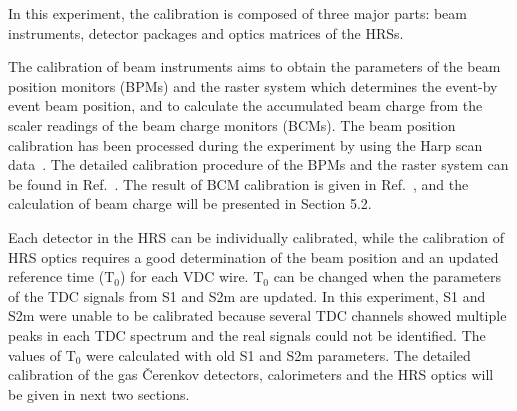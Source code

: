   In this experiment, the calibration is composed of three major parts: beam instruments, detector packages and optics matrices of the HRSs. 
 
 The calibration of beam instruments aims to obtain the parameters of the beam position monitors (BPMs) and the raster system which determines the event-by event beam position, and to calculate the accumulated beam charge from the scaler readings of the beam charge monitors (BCMs). The beam position calibration has been processed during the experiment by using the Harp scan data~\cite{bpm_runs}. The detailed calibration procedure of the BPMs and the raster system can be found in Ref.~\cite{bpm_cali}. The result of BCM calibration is given in Ref.~\cite{bcm_patricia}, and the calculation of beam charge will be presented in Section 5.2.
 
 Each detector in the HRS can be individually calibrated, while the calibration of HRS optics requires a good determination of the beam position and an updated reference time ($\mathrm{T_{0}}$) for each VDC wire. $\mathrm{T_{0}}$ can be changed when the parameters of the TDC signals from S1 and S2m are updated. In this experiment, S1 and S2m were unable to be calibrated because several TDC channels showed multiple peaks in each TDC spectrum and the real signals could not be identified. The values of $\mathrm{T_{0}}$ were calculated with old S1 and S2m parameters. The detailed calibration of the gas \v{C}erenkov detectors, calorimeters and the HRS optics will be given in next two sections.




